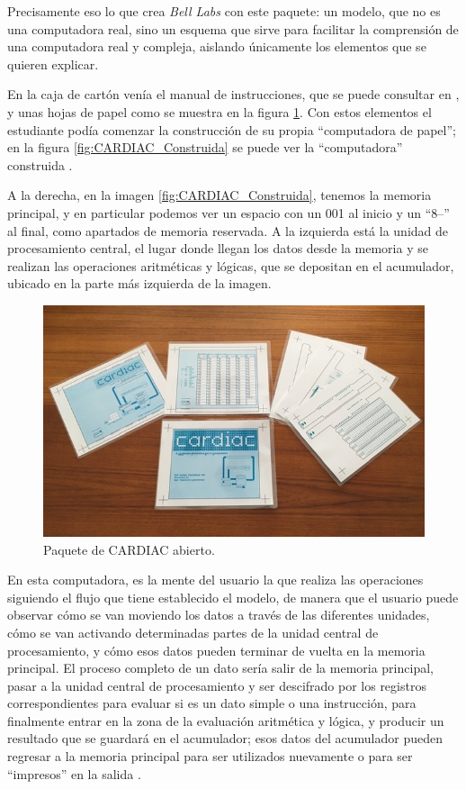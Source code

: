 \documentclass[letterpaper,12pt,oneside]{book}
\begin{document}
        Precisamente eso lo que crea \textit{Bell Labs} con este paquete: un modelo, que no es una computadora real, sino un esquema
        que sirve para facilitar la comprensión de una computadora real y compleja, aislando únicamente los elementos que se quieren explicar.
        
  
        En la caja de cartón venía el manual de instrucciones, que se puede consultar en  
		\cite{fingerman_instruction_1968}, y unas hojas de papel como se muestra en la figura \ref{fig:Kit_CARDIAC}. Con estos elementos el 
		estudiante podía comenzar la construcción de su propia ``computadora de papel''; en la figura \ref{fig:CARDIAC_Construida} se puede
		ver la ``computadora'' construida \cite{megardi_cardiac_nodate}.
  
		A la derecha, en la imagen \ref{fig:CARDIAC_Construida}, tenemos la memoria principal, y en particular podemos ver un espacio con un 001 al inicio y un ``8--'' al final, como apartados de memoria reservada. A la izquierda
		está la unidad de procesamiento central, el lugar donde llegan los datos desde la memoria y se realizan las operaciones aritméticas y lógicas,
		que se depositan en el acumulador, ubicado en la parte más izquierda de la imagen.
		
		\begin{figure}[h]
		\centering
			\includegraphics[scale=0.6]{media/CARDIAC_Paper/paper1.jpg}
			\caption{Paquete de CARDIAC abierto.}
			\label{fig:Kit_CARDIAC}%
		\end{figure}
		
		
		
		En esta computadora, es la mente del usuario la que realiza las operaciones  siguiendo el flujo que tiene establecido el modelo, de manera
		que el usuario  puede observar cómo se van moviendo los datos a través de las diferentes unidades, cómo se van activando determinadas
		partes de la unidad central de procesamiento, y cómo  esos datos pueden terminar de vuelta en la memoria principal. El proceso completo de un dato sería salir de la memoria principal, pasar
		a la unidad central de procesamiento y ser descifrado por los registros correspondientes para evaluar si es un dato simple o una instrucción,
		para finalmente entrar en la zona de la evaluación aritmética y lógica, y producir un resultado que se guardará en el acumulador; esos
		datos del acumulador pueden regresar a la memoria principal para ser utilizados nuevamente o para ser ``impresos'' en la salida \cite{fingerman_instruction_1968}.
		
\end{document}
